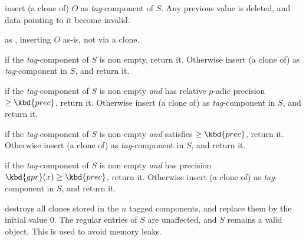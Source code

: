  insert (a clone of) $O$
as \emph{tag}-component of $S$. Any previous value is deleted, and
data pointing to it become invalid.

 as ,
inserting $O$ as-is, not via a clone.

 if the
\emph{tag}-component of $S$ is non empty, return it. Otherwise insert
(a clone of)  as \emph{tag}-component in $S$, and return it.

if the \emph{tag}-component of $S$ is non empty \emph{and} has relative
$p$-adic precision $\geq \kbd{prec}$, return it. Otherwise insert (a clone
of)  as \emph{tag}-component in $S$, and return it.

 if the \emph{tag}-component of $S$ is non empty \emph{and}
satisfies  $\geq \kbd{prec}$, return it. Otherwise insert (a
clone of)  as \emph{tag}-component in $S$, and return it.

 if the \emph{tag}-component of $S$ is non empty
\emph{and} has precision $\kbd{gpr}(x)\geq \kbd{prec}$, return it. Otherwise
insert (a clone of)  as \emph{tag}-component in $S$,
and return it.

 destroys all clones stored in the $n$ tagged
components, and replace them by the initial value $0$. The regular entries of
$S$ are unaffected, and $S$ remains a valid object. This is used to
avoid memory leaks.
